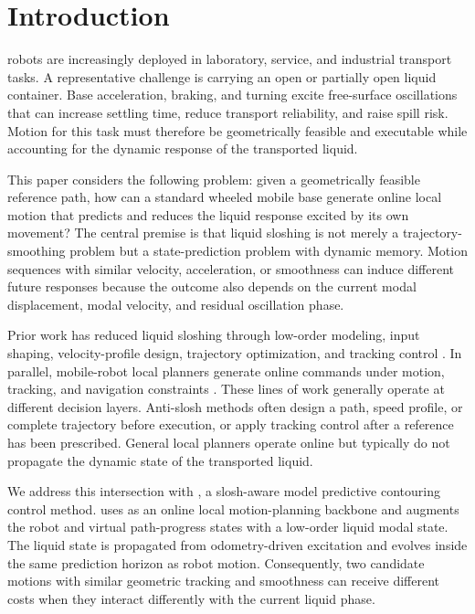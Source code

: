 \section{Introduction}

 robots are increasingly deployed in laboratory, service, and industrial transport tasks. A representative challenge is carrying an open or partially open liquid container. Base acceleration, braking, and turning excite free-surface oscillations that can increase settling time, reduce transport reliability, and raise spill risk. Motion for this task must therefore be geometrically feasible and executable while accounting for the dynamic response of the transported liquid.

This paper considers the following problem: given a geometrically feasible reference path, how can a standard wheeled mobile base generate online local motion that predicts and reduces the liquid response excited by its own movement? The central premise is that liquid sloshing is not merely a trajectory-smoothing problem but a state-prediction problem with dynamic memory. Motion sequences with similar velocity, acceleration, or smoothness can induce different future responses because the outcome also depends on the current modal displacement, modal velocity, and residual oscillation phase.

Prior work has reduced liquid sloshing through low-order modeling, input shaping, velocity-profile design, trajectory optimization, and tracking control \cite{A02_Guagliumi2021,A01_Leva2021,A07_Singer1990,A12_Okatsuka2011,C05_Okatsuka2012}. In parallel, mobile-robot local planners generate online commands under motion, tracking, and navigation constraints \cite{D15_Fox1997,D16_Rosmann2017,D17_Rosmann2021,D19_Liniger2015,D20_Brito2019}. These lines of work generally operate at different decision layers. Anti-slosh methods often design a path, speed profile, or complete trajectory before execution, or apply tracking control after a reference has been prescribed. General local planners operate online but typically do not propagate the dynamic state of the transported liquid.

We address this intersection with \SMPCC{}, a slosh-aware model predictive contouring control method. \SMPCC{} uses \MPCC{} as an online local motion-planning backbone and augments the robot and virtual path-progress states with a low-order liquid modal state. The liquid state is propagated from odometry-driven excitation and evolves inside the same prediction horizon as robot motion. Consequently, two candidate motions with similar geometric tracking and smoothness can receive different costs when they interact differently with the current liquid phase.


